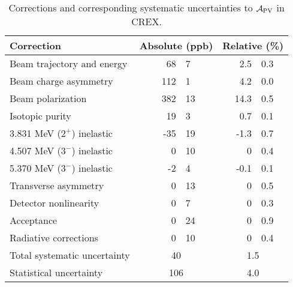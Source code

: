 \begin{table}[!h]
    \centering
    \begin{tabular}{l r@{ $\pm$ }l r@{ $\pm$ }l}
	\hline
	Correction & \multicolumn{2}{c}{Absolute (ppb)}	& \multicolumn{2}{c}{Relative (\%)}   \\
	\hline
	Beam trajectory and energy  & 68  & 7     & 2.5	    & 0.3   \\         
	Beam charge asymmetry       & 112 & 1     & 4.2     & 0.0   \\         
	\hline
	Beam polarization	    & 382 & 13    & 14.3    & 0.5   \\         
	Isotopic purity             & 19  & 3     & 0.7     & 0.1   \\         
	3.831 MeV ($2^+$) inelastic & -35 & 19    & -1.3    & 0.7   \\         
	4.507 MeV ($3^-$) inelastic & 0   & 10    & 0	    & 0.4   \\ 
	5.370 MeV ($3^-$) inelastic & -2  & 4     & -0.1    & 0.1   \\         
	Transverse asymmetry        & 0   & 13    & 0	    & 0.5   \\ 
	Detector nonlinearity       & 0   & 7     & 0	    & 0.3   \\         
	Acceptance                  & 0   & 24    & 0  	    & 0.9   \\         
	Radiative corrections	    & 0   & 10    & 0  	    & 0.4   \\         
	\hline
	Total systematic uncertainty	& \multicolumn{2}{c}{40}    & \multicolumn{2}{c}{1.5}	\\
	Statistical uncertainty		& \multicolumn{2}{c}{106}   & \multicolumn{2}{c}{4.0}	\\
	\hline
    \end{tabular}
    \caption{Corrections and corresponding systematic uncertainties to $\mathcal{A}_{\text{PV}}$ in CREX.}
    \label{tab:crex_corrections}
\end{table}


